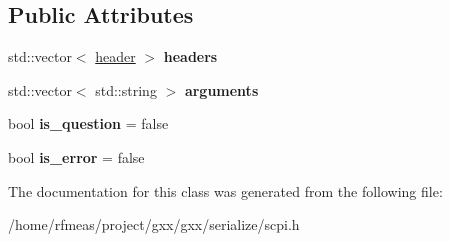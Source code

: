 \subsection*{Public Attributes}
\begin{DoxyCompactItemize}
\item 
std\+::vector$<$ \hyperlink{structgxx_1_1scpi__string__parser_1_1header}{header} $>$ {\bfseries headers}\hypertarget{classgxx_1_1scpi__string__parser_a1581d8bc635b17075a62679c1af4ab22}{}\label{classgxx_1_1scpi__string__parser_a1581d8bc635b17075a62679c1af4ab22}

\item 
std\+::vector$<$ std\+::string $>$ {\bfseries arguments}\hypertarget{classgxx_1_1scpi__string__parser_a2875992089894871042caef42b18f335}{}\label{classgxx_1_1scpi__string__parser_a2875992089894871042caef42b18f335}

\item 
bool {\bfseries is\+\_\+question} = false\hypertarget{classgxx_1_1scpi__string__parser_a07ece834e3c02e67a5f52b820e90eb4a}{}\label{classgxx_1_1scpi__string__parser_a07ece834e3c02e67a5f52b820e90eb4a}

\item 
bool {\bfseries is\+\_\+error} = false\hypertarget{classgxx_1_1scpi__string__parser_a0aebbf942a3bf00bce3814bfea231101}{}\label{classgxx_1_1scpi__string__parser_a0aebbf942a3bf00bce3814bfea231101}

\end{DoxyCompactItemize}


The documentation for this class was generated from the following file\+:\begin{DoxyCompactItemize}
\item 
/home/rfmeas/project/gxx/gxx/serialize/scpi.\+h\end{DoxyCompactItemize}
